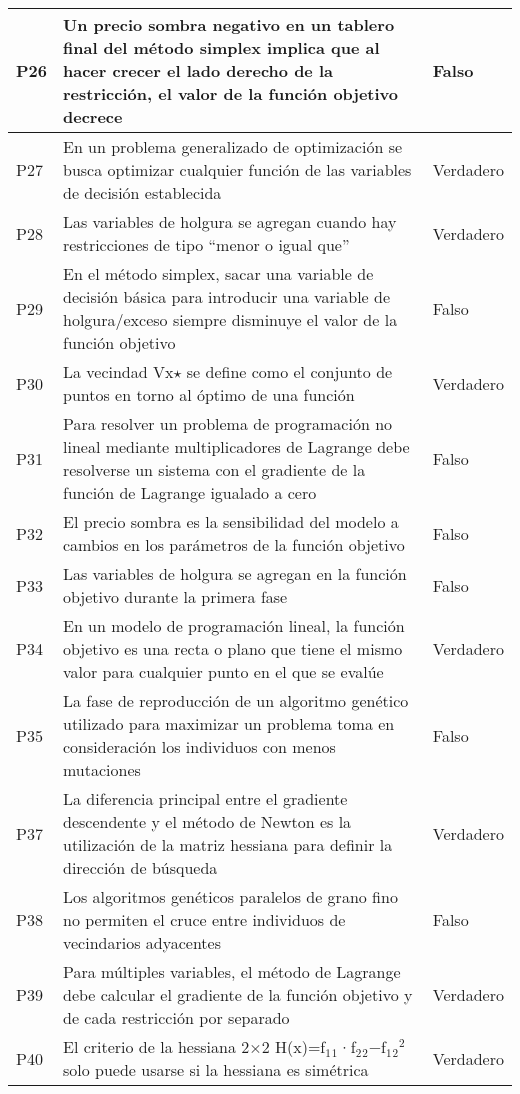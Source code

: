\documentclass{article}
\begin{document}
\begin{longtable}{|p{1.5cm}|p{14cm}|p{2cm}|}
P26 & Un precio sombra negativo en un tablero final del método simplex implica que al hacer crecer el lado derecho de la restricción, el valor de la función objetivo decrece & Falso \\ \hline
P27 & En un problema generalizado de optimización se busca optimizar cualquier función de las variables de decisión establecida & Verdadero \\ \hline
P28 & Las variables de holgura se agregan cuando hay restricciones de tipo “menor o igual que” & Verdadero \\ \hline
P29 & En el método simplex, sacar una variable de decisión básica para introducir una variable de holgura/exceso siempre disminuye el valor de la función objetivo & Falso \\ \hline
P30 & La vecindad Vx$\star$ se define como el conjunto de puntos en torno al óptimo de una función & Verdadero \\ \hline
P31 & Para resolver un problema de programación no lineal mediante multiplicadores de Lagrange debe resolverse un sistema con el gradiente de la función de Lagrange igualado a cero & Falso \\ \hline
P32 & El precio sombra es la sensibilidad del modelo a cambios en los parámetros de la función objetivo & Falso \\ \hline
P33 & Las variables de holgura se agregan en la función objetivo durante la primera fase & Falso \\ \hline
P34 & En un modelo de programación lineal, la función objetivo es una recta o plano que tiene el mismo valor para cualquier punto en el que se evalúe & Verdadero \\ \hline
P35 & La fase de reproducción de un algoritmo genético utilizado para maximizar un problema toma en consideración los individuos con menos mutaciones & Falso \\ \hline
P37 & La diferencia principal entre el gradiente descendente y el método de Newton es la utilización de la matriz hessiana para definir la dirección de búsqueda & Verdadero \\ \hline
P38 & Los algoritmos genéticos paralelos de grano fino no permiten el cruce entre individuos de vecindarios adyacentes & Falso \\ \hline
P39 & Para múltiples variables, el método de Lagrange debe calcular el gradiente de la función objetivo y de cada restricción por separado & Verdadero \\ \hline
P40 & El criterio de la hessiana 2×2 H(x)=f$_1$$_1$·f$_2$$_2$−f$_1$$_2$$^2$ solo puede usarse si la hessiana es simétrica & Verdadero \\ \hline

\end{longtable}
\end{document}
